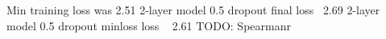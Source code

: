 Min training loss was 2.51
2-layer model 0.5 dropout final loss ~2.69
2-layer model 0.5 dropout minloss loss ~ 2.61
TODO: Spearmanr
